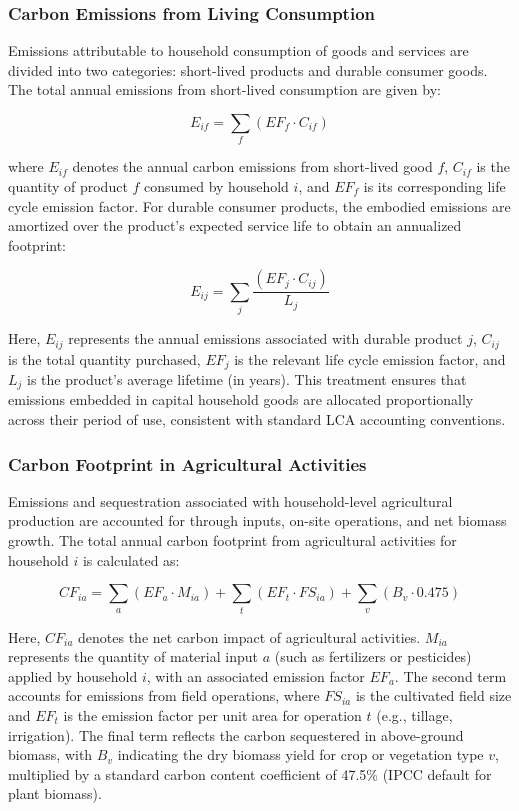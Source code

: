 \documentclass[12pt,a4paper]{article}%
\begin{document}
\subsubsection{Carbon Emissions from Living Consumption}

Emissions attributable to household consumption of goods and services are divided into two categories: short-lived products and durable consumer goods. The total annual emissions from short-lived consumption are given by:

\begin{equation}
E_{if} = \sum_f (EF_f \cdot C_{if})
\end{equation}

where $E_{if}$ denotes the annual carbon emissions from short-lived good $f$, $C_{if}$ is the quantity of product $f$ consumed by household $i$, and $EF_f$ is its corresponding life cycle emission factor. For durable consumer products, the embodied emissions are amortized over the product's expected service life to obtain an annualized footprint:

\begin{equation}
E_{ij} = \sum_j \frac{(EF_j \cdot C_{ij})}{L_j}
\end{equation}

Here, $E_{ij}$ represents the annual emissions associated with durable product $j$, $C_{ij}$ is the total quantity purchased, $EF_j$ is the relevant life cycle emission factor, and $L_j$ is the product’s average lifetime (in years). This treatment ensures that emissions embedded in capital household goods are allocated proportionally across their period of use, consistent with standard LCA accounting conventions.


\subsubsection{Carbon Footprint in Agricultural Activities}

Emissions and sequestration associated with household-level agricultural production are accounted for through inputs, on-site operations, and net biomass growth. The total annual carbon footprint from agricultural activities for household $i$ is calculated as:

\begin{equation}
CF_{ia} = \sum_a (EF_a \cdot M_{ia}) + \sum_t (EF_t \cdot FS_{ia}) + \sum_v (B_v \cdot 0.475)
\end{equation}

Here, $CF_{ia}$ denotes the net carbon impact of agricultural activities. $M_{ia}$ represents the quantity of material input $a$ (such as fertilizers or pesticides) applied by household $i$, with an associated emission factor $EF_a$. The second term accounts for emissions from field operations, where $FS_{ia}$ is the cultivated field size and $EF_t$ is the emission factor per unit area for operation $t$ (e.g., tillage, irrigation). The final term reflects the carbon sequestered in above-ground biomass, with $B_v$ indicating the dry biomass yield for crop or vegetation type $v$, multiplied by a standard carbon content coefficient of 47.5\% (IPCC default for plant biomass).
\end{document}
